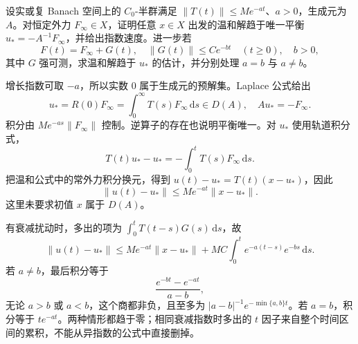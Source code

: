 \begin{exercise}\label{b2:ex:app-D-7}
设实或复 Banach 空间上的 \(C_0\)-半群满足
\(\|T(t)\|\leq Me^{-at}\)、\(a>0\)，生成元为 \(A\)。对恒定外力 \(F_\infty\in X\)，证明任意 \(x\in X\) 出发的温和解趋于唯一平衡
\(u_*=-A^{-1}F_\infty\)，并给出指数速度。进一步若
\[
 F(t)=F_\infty+G(t),\quad
 \|G(t)\|\leq Ce^{-bt}\quad(t\geq0),\quad b>0,
\]
其中 \(G\) 强可测，求温和解趋于 \(u_*\) 的估计，并分别处理 \(a=b\) 与 \(a\ne b\)。
\end{exercise}
\begin{solution}
增长指数可取 \(-a\)，所以实数 \(0\) 属于生成元的预解集。Laplace 公式给出
\[
 u_*=R(0)F_\infty=\int_0^\infty T(s)F_\infty\,\mathrm ds\in D(A),
 \quad Au_*=-F_\infty.
\]
积分由 \(Me^{-as}\|F_\infty\|\) 控制。逆算子的存在也说明平衡唯一。对 \(u_*\) 使用轨道积分式，
\[
 T(t)u_*-u_*=-\int_0^tT(s)F_\infty\,\mathrm ds.
\]
把温和公式中的常外力积分换元，得到
\(u(t)-u_*=T(t)(x-u_*)\)，因此
\[
 \|u(t)-u_*\|\leq Me^{-at}\|x-u_*\|.
\]
这里未要求初值 \(x\) 属于 \(D(A)\)。

有衰减扰动时，多出的项为 \(\int_0^tT(t-s)G(s)\,\mathrm ds\)，故
\[
 \|u(t)-u_*\|
 \leq Me^{-at}\|x-u_*\|+MC\int_0^te^{-a(t-s)}e^{-bs}\,\mathrm ds.
\]
若 \(a\ne b\)，最后积分等于
\[
 \frac{e^{-bt}-e^{-at}}{a-b},
\]
无论 \(a>b\) 或 \(a<b\)，这个商都非负，且至多为
\(|a-b|^{-1}e^{-\min\{a,b\}t}\)。若 \(a=b\)，积分等于 \(te^{-at}\)。两种情形都趋于零；相同衰减指数时多出的 \(t\) 因子来自整个时间区间的累积，不能从异指数的公式中直接删掉。
\end{solution}

